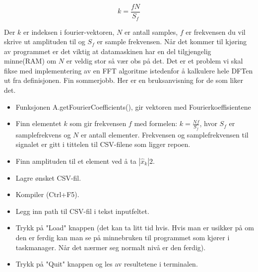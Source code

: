 \documentclass{article}
\begin{document}
            \[
                k = \frac{fN}{S_f}
            \]

            Der \(k\) er indeksen i fourier-vektoren, \(N\) er antall samples, \(f\) er frekvensen du vil skrive ut amplituden til og \(S_f\) er sample frekvensen.
            Når det kommer til kjøring av programmet er det viktig at datamaskinen har en del tilgjengelig minne(RAM) om \(N\) er veldig stor så vær obs på det.
            Det er et problem vi skal fikse med implementering av en FFT algoritme istedenfor å kalkulere hele DFTen ut fra definisjonen. Fin sommerjobb.
            Her er en bruksanvisning for de som liker det.

            \begin{itemize}
                \item Funksjonen A.getFourierCoefficients(), gir vektoren med Fourierkoeffisientene
                \item Finn elementet $k$ som gir frekvensen $f$ med formelen: $k = \frac{Nf}{S_f}$, hvor $S_f$ er samplefrekvens og $N$ er antall elementer. Frekvensen og samplefrekvensen til signalet er gitt i tittelen til CSV-filene som ligger repoen.
                \item Finn amplituden til et element ved å ta $|\hat{x}_k|2$.
                \item Lagre ønsket CSV-fil.
                \item Kompiler (Ctrl+F5).
                \item Legg inn path til CSV-fil i tekst inputfeltet.
                \item Trykk på "Load" knappen (det kan ta litt tid hvis. Hvis man er usikker på om den er ferdig kan man se på minnebruken til programmet som kjører i taskmanager. Når det nærmer seg normalt nivå er den ferdig).
                \item Trykk på "Quit" knappen og les av resultetene i terminalen.
            \end{itemize}
            
\end{document}
